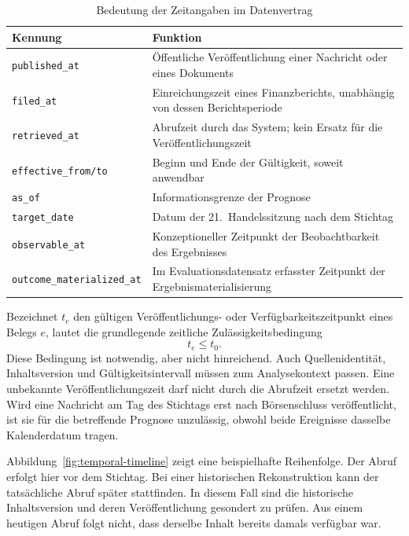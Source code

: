 \begin{table}[htbp]
\centering
\caption{Bedeutung der Zeitangaben im Datenvertrag}
\label{tab:temporal-fields}
\small
\begin{tabularx}{\textwidth}{@{}>{\raggedright\arraybackslash}p{}>{\raggedright\arraybackslash}X@{}}
\toprule
Kennung & Funktion \\
\midrule
\texttt{published\_at} & Öffentliche Veröffentlichung einer Nachricht oder eines Dokuments \\
\texttt{filed\_at} & Einreichungszeit eines Finanzberichts, unabhängig von dessen Berichtsperiode \\
\texttt{retrieved\_at} & Abrufzeit durch das System; kein Ersatz für die Veröffentlichungszeit \\
\texttt{effective\_from/to} & Beginn und Ende der Gültigkeit, soweit anwendbar \\
\texttt{as\_of} & Informationsgrenze der Prognose \\
\texttt{target\_date} & Datum der 21.~Handelssitzung nach dem Stichtag \\
\texttt{observable\_at} & Konzeptioneller Zeitpunkt der Beobachtbarkeit des Ergebnisses \\
\texttt{outcome\_materialized\_at} & Im Evaluationsdatensatz erfasster Zeitpunkt der Ergebnismaterialisierung \\
\bottomrule
\end{tabularx}
\end{table}

Bezeichnet $t_e$ den gültigen Veröffentlichungs- oder Verfügbarkeitszeitpunkt eines Belegs $e$, lautet die grundlegende zeitliche Zulässigkeitsbedingung
\begin{equation}
 t_e\leq t_0.
 \label{eq:evidence-cutoff}
\end{equation}
Diese Bedingung ist notwendig, aber nicht hinreichend. Auch Quellenidentität, Inhaltsversion und Gültigkeitsintervall müssen zum Analysekontext passen. Eine unbekannte Veröffentlichungszeit darf nicht durch die Abrufzeit ersetzt werden. Wird eine Nachricht am Tag des Stichtags erst nach Börsenschluss veröffentlicht, ist sie für die betreffende Prognose unzulässig, obwohl beide Ereignisse dasselbe Kalenderdatum tragen.

Abbildung~\ref{fig:temporal-timeline} zeigt eine beispielhafte Reihenfolge. Der Abruf erfolgt hier vor dem Stichtag. Bei einer historischen Rekonstruktion kann der tatsächliche Abruf später stattfinden. In diesem Fall sind die historische Inhaltsversion und deren Veröffentlichung gesondert zu prüfen. Aus einem heutigen Abruf folgt nicht, dass derselbe Inhalt bereits damals verfügbar war.

